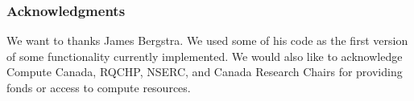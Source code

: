 \documentclass{article} %
\begin{document}
% 
% 


\subsubsection*{Acknowledgments}

We want to thanks James Bergstra. We used some of his code as the first version of some functionality currently implemented. We would also like to acknowledge Compute Canada, RQCHP, NSERC, and Canada Research Chairs for providing fonds or access to compute resources.




\end{document}
